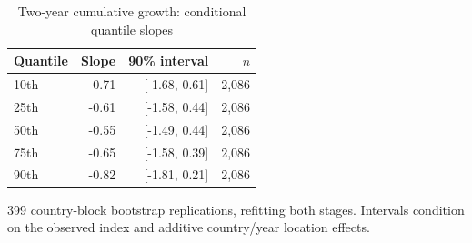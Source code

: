 \begin{table}[!htbp]
\centering\small
\caption{Two-year cumulative growth: conditional quantile slopes}\label{tab:gar}
\begin{tabular}{lrrr}\toprule
Quantile & Slope & 90\% interval & $n$ \\
\midrule
10th & -0.71 & [-1.68, 0.61] & 2,086 \\
25th & -0.61 & [-1.58, 0.44] & 2,086 \\
50th & -0.55 & [-1.49, 0.44] & 2,086 \\
75th & -0.65 & [-1.58, 0.39] & 2,086 \\
90th & -0.82 & [-1.81, 0.21] & 2,086 \\
\bottomrule\end{tabular}
\par\smallskip\begin{minipage}{0.98\linewidth}\footnotesize 399 country-block bootstrap replications, refitting both stages. Intervals condition on the observed index and additive country/year location effects.\end{minipage}
\end{table}
